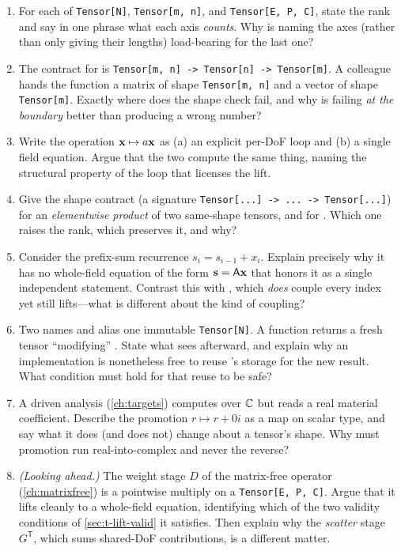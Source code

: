 \exercisessection
\begin{enumerate}[nosep]
  \item For each of \lstinline[style=l4style]|Tensor[N]|,
  \lstinline[style=l4style]|Tensor[m, n]|, and
  \lstinline[style=l4style]|Tensor[E, P, C]|, state the rank and say in one
  phrase what each axis \emph{counts}. Why is naming the axes (rather than only
  giving their lengths) load-bearing for the last one?
  \item The contract for  is
  \lstinline[style=l4style]|Tensor[m, n] -> Tensor[n] -> Tensor[m]|. A colleague
  hands the function a matrix of shape \lstinline[style=l4style]|Tensor[m, n]| and
  a vector of shape \lstinline[style=l4style]|Tensor[m]|. Exactly where does the
  shape check fail, and why is failing \emph{at the boundary} better than
  producing a wrong number?
  \item Write the  operation $\mathbf{x} \mapsto a\mathbf{x}$ as (a) an explicit
  per-DoF loop and (b) a single field equation. Argue that the two compute the
  same thing, naming the structural property of the loop that licenses the lift.
  \item Give the shape contract (a signature
  \lstinline[style=l4style]|Tensor[...] -> ... -> Tensor[...]|) for an
  \emph{elementwise product} of two same-shape tensors, and for .
  Which one raises the rank, which preserves it, and why?
  \item Consider the prefix-sum recurrence $s_i = s_{i-1} + x_i$. Explain
  precisely why it has no whole-field equation of the form $\mathbf{s} = \mathsf{A}\mathbf{x}$ that
  honors it as a single independent statement. Contrast this with ,
  which \emph{does} couple every index yet still lifts---what is different about
  the kind of coupling?
  \item Two names  and  alias one immutable
  \lstinline[style=l4style]|Tensor[N]|. A function returns a fresh tensor
  ``modifying'' . State what  sees afterward, and explain why an
  implementation is nonetheless free to reuse 's storage for the new
  result. What condition must hold for that reuse to be safe?
  \item A driven analysis (\cref{ch:targets}) computes over $\mathbb{C}$ but reads
  a real material coefficient. Describe the promotion $r \mapsto r + 0i$ as a map
  on scalar type, and say what it does (and does not) change about a tensor's
  shape. Why must promotion run real-into-complex and never the reverse?
  \item \emph{(Looking ahead.)} The weight stage $D$ of the matrix-free operator
  (\cref{ch:matrixfree}) is a pointwise multiply on a
  \lstinline[style=l4style]|Tensor[E, P, C]|. Argue that it lifts cleanly to a
  whole-field equation, identifying which of the two validity conditions of
  \cref{sec:t-lift-valid} it satisfies. Then explain why the \emph{scatter}
  stage $G^{\mathsf T}$, which sums shared-DoF contributions, is a different
  matter.
\end{enumerate}
